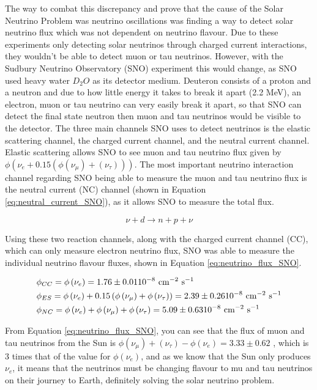 The way to combat this discrepancy and prove that the cause of the Solar Neutrino Problem was neutrino oscillations was finding a way to detect solar neutrino flux which was not dependent on neutrino flavour. Due to these experiments only detecting solar neutrinos through charged current interactions, they wouldn't be able to detect muon or tau neutrinos. However, with the Sudbury Neutrino Observatory (SNO) experiment this would change, as SNO used heavy water $D_{2}O$ as its detector medium. Deuteron consists of a proton and a neutron and due to how little energy it takes to break it apart (2.2 MeV), an electron, muon or tau neutrino can very easily break it apart, so that SNO can detect the final state neutron then muon and tau neutrinos would be visible to the detector. The three main channels SNO uses to detect neutrinos is the elastic scattering channel, the charged current channel, and the neutral current channel. Elastic scattering allows SNO to see muon and tau neutrino flux given by $\phi(\nu_{e} + 0.15(\phi(\nu_{\mu}) + (\nu_{\tau})))$. The most important neutrino interaction channel regarding SNO being able to measure the muon and tau neutrino flux is the neutral current (NC) channel (shown in Equation \ref{eq:neutral_current_SNO}), as it allows SNO to measure the total flux.

\begin{equation}
    \nu + d \rightarrow n + p + \nu
\label{eq:neutral_current_SNO}
\end{equation}

Using these two reaction channels, along with the charged current channel (CC), which can only measure electron neutrino flux, SNO was able to measure the individual neutrino flavour fluxes, shown in Equation \ref{eq:neutrino_flux_SNO}. 


\begin{align}
&\phi_{C C}=\phi\left(\nu_{e}\right)=1.76 \pm 0.01 10^{-8} \mathrm{~cm}^{-2} \mathrm{~s}^{-1} \label{eq:neutrino_flux_SNO}\\
&\phi_{E S}=\phi\left(\nu_{e}\right)+0.15\left(\phi\left(\nu_{\mu}\right)+\phi\left(\nu_{\tau}\right)\right)=2.39 \pm 0.26 10^{-8} \mathrm{~cm}^{-2} \mathrm{~s}^{-1} \notag\\
&\phi_{N C}=\phi\left(\nu_{e}\right)+\phi\left(\nu_{\mu}\right)+\phi\left(\nu_{\tau}\right) = 5.09 \pm 0.63 10^{-8} \mathrm{~cm}^{-2} \mathrm{~s}^{-1} \notag
\end{align}


From Equation \ref{eq:neutrino_flux_SNO}, you can see that the flux of muon and tau neutrinos from the Sun is $\phi(\nu_{\mu}) + (\nu_{\tau}) - \phi(\nu_{e}) = 3.33 \pm 0.62$ , which is 3 times that of the value for $\phi(\nu_{e})$, and as we know that the Sun only produces $\nu_{e}$, it means that the neutrinos must be changing flavour to mu and tau neutrinos on their journey to Earth, definitely solving the solar neutrino problem. 



